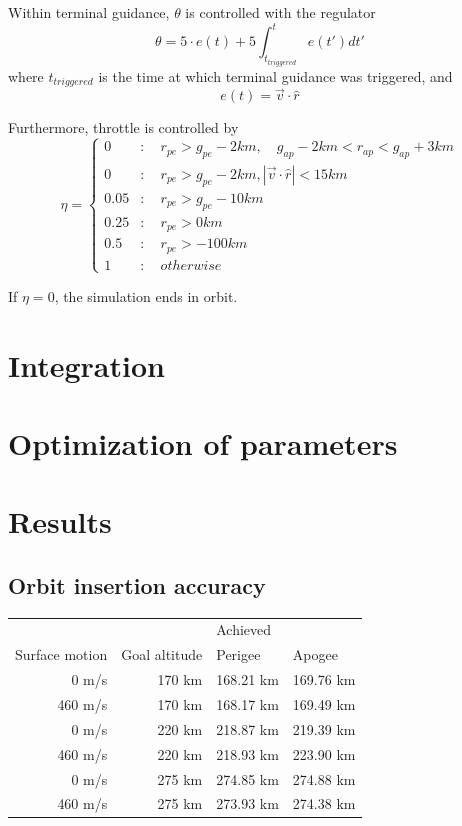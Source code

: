 \documentclass[11pt]{article}
\begin{document}
Within terminal guidance, $\theta$ is controlled with the regulator 
$$
\theta = 5 \cdot e(t) + 5 \int_{t_{triggered}}^t e(t') dt'
$$
where $t_{triggered}$ is the time at which terminal guidance was triggered, and
$$
e(t) = \vec{v} \cdot \hat{r}
$$

Furthermore, throttle is controlled by
$$
\eta = \begin{cases}
0 & : \quad r_{pe} > g_{pe} - 2 km, \quad g_{ap} - 2 km < r_{ap} < g_{ap} + 3 km \\
0 & : \quad r_{pe} > g_{pe} - 2 km, \left| \vec{v} \cdot \hat{r} \right| < 15 km \\
0.05 & : \quad r_{pe} > g_{pe} - 10 km \\
0.25 & : \quad r_{pe} > 0 km \\
0.5 & : \quad r_{pe} > -100 km \\
1 & :  \quad otherwise
\end{cases}
$$

If $\eta = 0$, the simulation ends in orbit.

\section{Integration}

\section{Optimization of parameters}

\section{Results}

\subsection{Orbit insertion accuracy}
\begin{center}
  \begin{tabular}{ r | r  | l  l  }
     &   &  Achieved  \\
    Surface motion & Goal altitude & Perigee & Apogee \\
    \hline
    0 m/s & 170 km & 168.21 km & 169.76 km \\
    460 m/s & 170 km & 168.17 km & 169.49 km \\
    \hline
    0 m/s & 220 km & 218.87 km & 219.39 km \\
    460 m/s & 220 km  & 218.93 km & 223.90 km \\
    \hline
    0 m/s & 275 km & 274.85 km & 274.88 km \\
    460 m/s & 275 km & 273.93 km & 274.38 km
  \end{tabular}
\end{center}
\end{document}
